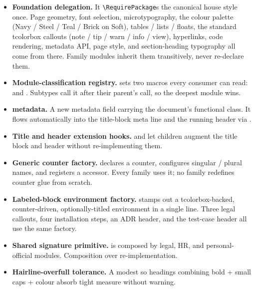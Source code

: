 \documentclass[11pt]{article}
\begin{document}
\begin{itemize}
  \item \textbf{Foundation delegation.} It \texttt{\textbackslash RequirePackage}s the
        canonical house style  once. Page
        geometry, font selection, microtypography, the colour palette
        (Navy / Steel / Teal / Brick on Soft), tables / lists / floats,
        the standard tcolorbox callouts (note / tip / warn / info / view),
        hyperlinks, code rendering, metadata API, page style, and
        section-heading typography all come from there. Family modules
        inherit them transitively, never re-declare them.
  \item \textbf{Module-classification registry.}
         sets two macros every consumer can
        read:  and .
        Subtypes call it after their parent's call, so the deepest module
        wins.
  \item \textbf{ metadata.} A new metadata field carrying
        the document's functional class. It flows automatically into the
        title-block meta line and the running header via
        .
  \item \textbf{Title and header extension hooks.}
         and  let
        children augment the title block and header without
        re-implementing them.
  \item \textbf{Generic counter factory.}  declares
        a counter, configures  singular / plural names,
        and registers a  accessor. Every family
        uses it; no family redefines counter glue from scratch.
  \item \textbf{Labeled-block environment factory.}
         stamps out a tcolorbox-backed,
        counter-driven, optionally-titled environment in a single line.
        Three legal callouts, four installation steps, an ADR header,
        and the test-case header all use the same factory.
  \item \textbf{Shared signature primitive.} 
        is composed by legal, HR, and personal-official modules.
        Composition over re-implementation.
  \item \textbf{Hairline-overfull tolerance.} A modest
         so headings combining bold + small caps +
        colour absorb tight measure without warning.
\end{itemize}
\end{document}
